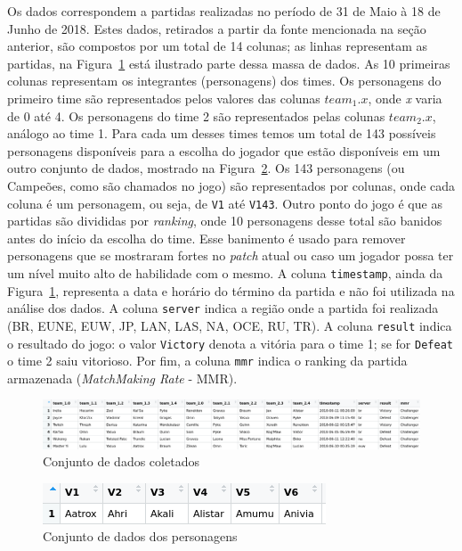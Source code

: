 \documentclass[a4paper]{article}
\begin{document}
Os dados correspondem a partidas realizadas no período de 31 de Maio à 18 de Junho de 2018. Estes dados, retirados a partir da fonte mencionada na seção anterior, são compostos por um total de 14 colunas; as linhas representam as partidas, na Figura~\ref{fig:dataantes} está ilustrado parte dessa massa de dados. As 10 primeiras colunas representam os integrantes (personagens) dos times. Os personagens do primeiro time são representados pelos valores das colunas $team_1.x$, onde \textit{x} varia de 0 até 4.  Os personagens do time 2 são representados pelas colunas $team_2.x$, análogo ao time 1. Para cada um desses times temos um total de 143 possíveis personagens disponíveis para a escolha do jogador que estão disponíveis em um outro conjunto de dados, mostrado na Figura~\ref{fig:champantes}. Os 143 personagens (ou Campeões, como são chamados no jogo) são representados por colunas, onde cada coluna é um personagem, ou seja, de \texttt{V1} até \texttt{V143}. Outro ponto do jogo é que as partidas são divididas por \textit{ranking}, onde 10 personagens desse total são banidos antes do início da escolha do time. Esse banimento é usado para remover personagens que se mostraram fortes no \textit{patch} atual ou caso um jogador possa ter um nível muito alto de habilidade com o mesmo. A coluna \texttt{timestamp}, ainda da Figura~\ref{fig:dataantes}, representa a data e horário do término da partida e não foi utilizada na análise dos dados. A coluna \texttt{server} indica a região onde a partida foi realizada (BR, EUNE, EUW, JP, LAN, LAS, NA, OCE, RU, TR). A coluna \texttt{result} indica o resultado do jogo: o valor \texttt{Victory} denota a vitória para o time 1; se for \texttt{Defeat} o time 2 saiu vitorioso. Por fim, a coluna \texttt{mmr} indica o ranking da partida armazenada (\textit{MatchMaking Rate} - MMR).

\begin{figure}[ht]
\centering
\includegraphics[width=15cm]{imagens/data_before}
\caption{\label{fig:dataantes}Conjunto de dados coletados}
\end{figure}

\begin{figure}[ht]
\centering
\includegraphics{imagens/champ_data}
\caption{\label{fig:champantes}Conjunto de dados dos personagens}
\end{figure}
\end{document}
